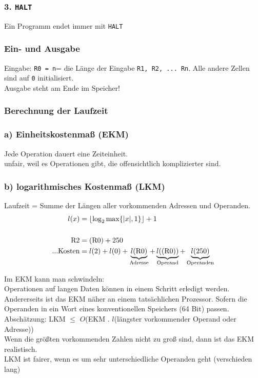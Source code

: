 \subsubsection*{3. \lstinline!HALT!}
Ein Programm endet immer mit \lstinline!HALT!
\subsubsection*{Ein- und Ausgabe}
Eingabe: \lstinline!R0 = n!= die Länge der Eingabe \lstinline!R1, R2, ... Rn!. Alle andere Zellen sind auf \lstinline!0! initialisiert.\\
Ausgabe steht am Ende im Speicher!\\

\subsubsection{Berechnung der Laufzeit}
\subsubsection*{a) Einheitskostenmaß (EKM)}
Jede Operation dauert eine Zeiteinheit.\\unfair, weil es Operationen gibt, die offensichtlich komplizierter sind.
\subsubsection*{b) logarithmisches Kostenmaß (LKM)}
Laufzeit = Summe der Längen aller vorkommenden Adressen und Operanden.
\begin{align*}
l (x) &= \lfloor \log_2 \max \{|x|,1\} \rfloor +1\\
\\
\text{\lstinline!R2!} &= (\text{\lstinline!R0!}) + 250\\
\text{...Kosten} &= l(2) + l(0) + \underbrace{l(\text{\lstinline!R0!})}_\text{Adresse} + \underbrace{l((\text{\lstinline!R0!}))}_\text{Operand}+\underbrace{l(250)}_\text{Operanden}
\end{align*}

Im EKM kann man schwindeln:\\
Operationen auf langen Daten können in einem Schritt erledigt werden.\\
Andererseits ist das EKM näher an einem tatsächlichen Prozessor. Sofern die Operanden in ein Wort eines konventionellen Speichers (64 Bit) passen.\\
Abschätzung: LKM $\leq$ $O$(EKM . $l$(längster vorkommender Operand oder Adresse))\\
Wenn die größten vorkommenden Zahlen nicht zu groß sind, dann ist das EKM realistisch.\\
LKM ist fairer, wenn es um sehr unterschiedliche Operanden geht (verschieden lang)\\

